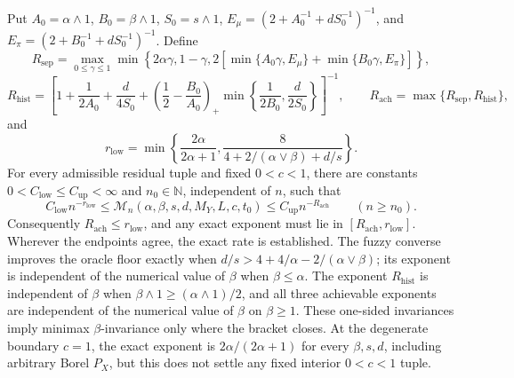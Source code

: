 Put \(A_0=\alpha\wedge1\), \(B_0=\beta\wedge1\), \(S_0=s\wedge1\), \(E_\mu=(2+A_0^{-1}+dS_0^{-1})^{-1}\), and \(E_\pi=(2+B_0^{-1}+dS_0^{-1})^{-1}\). Define
\[
R_{\mathrm{sep}}=\max_{0\le\gamma\le1}\min\left\{2\alpha\gamma,1-\gamma,2\left[\min\{A_0\gamma,E_\mu\}+\min\{B_0\gamma,E_\pi\}\right]\right\},
\]
\[
R_{\mathrm{hist}}=\left[1+\frac1{2A_0}+\frac d{4S_0}+\left(\frac12-\frac{B_0}{A_0}\right)_+\min\left\{\frac1{2B_0},\frac d{2S_0}\right\}\right]^{-1},
\qquad
R_{\mathrm{ach}}=\max\{R_{\mathrm{sep}},R_{\mathrm{hist}}\},
\]
and
\[
r_{\mathrm{low}}=\min\left\{\frac{2\alpha}{2\alpha+1},\frac{8}{4+2/(\alpha\vee\beta)+d/s}\right\}.
\]
For every admissible residual tuple and fixed \(0<c<1\), there are constants \(0<C_{\mathrm{low}}\le C_{\mathrm{up}}<\infty\) and \(n_0\in\mathbb N\), independent of \(n\), such that
\[
C_{\mathrm{low}}n^{-r_{\mathrm{low}}}
\le\mathcal M_n(\alpha,\beta,s,d,M_Y,L,c,t_0)
\le C_{\mathrm{up}}n^{-R_{\mathrm{ach}}}
\qquad(n\ge n_0).
\]
Consequently \(R_{\mathrm{ach}}\le r_{\mathrm{low}}\), and any exact exponent must lie in \([R_{\mathrm{ach}},r_{\mathrm{low}}]\). Wherever the endpoints agree, the exact rate is established. The fuzzy converse improves the oracle floor exactly when \(d/s>4+4/\alpha-2/(\alpha\vee\beta)\); its exponent is independent of the numerical value of \(\beta\) when \(\beta\le\alpha\). The exponent \(R_{\mathrm{hist}}\) is independent of \(\beta\) when \(\beta\wedge1\ge(\alpha\wedge1)/2\), and all three achievable exponents are independent of the numerical value of \(\beta\) on \(\beta\ge1\). These one-sided invariances imply minimax \(\beta\)-invariance only where the bracket closes. At the degenerate boundary \(c=1\), the exact exponent is \(2\alpha/(2\alpha+1)\) for every \(\beta,s,d\), including arbitrary Borel \(P_X\), but this does not settle any fixed interior \(0<c<1\) tuple.